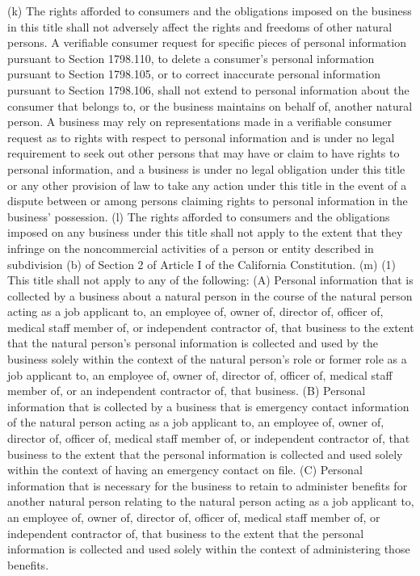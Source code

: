 (k) The rights afforded to consumers and the obligations imposed on the business in this title shall not adversely affect the rights and freedoms of other natural persons. A verifiable consumer request for specific pieces of personal information pursuant to Section 1798.110, to delete a consumer’s personal information pursuant to Section 1798.105, or to correct inaccurate personal information pursuant to Section 1798.106, shall not extend to personal information about the consumer that belongs to, or the business maintains on behalf of, another natural person. A business may rely on representations made in a verifiable consumer request as to rights with respect to personal information and is under no legal requirement to seek out other persons that may have or claim to have rights to personal information, and a business is under no legal obligation under this title or any other provision of law to take any action under this title in the event of a dispute between or among persons claiming rights to personal information in the business’ possession.
(l) The rights afforded to consumers and the obligations imposed on any business under this title shall not apply to the extent that they infringe on the noncommercial activities of a person or entity described in subdivision (b) of Section 2 of Article I of the California Constitution.
(m) (1) This title shall not apply to any of the following:
(A) Personal information that is collected by a business about a natural person in the course of the natural person acting as a job applicant to, an employee of, owner of, director of, officer of, medical staff member of, or independent contractor of, that business to the extent that the natural person’s personal information is collected and used by the business solely within the context of the natural person’s role or former role as a job applicant to, an employee of, owner of, director of, officer of, medical staff member of, or an independent contractor of, that business.
(B) Personal information that is collected by a business that is emergency contact information of the natural person acting as a job applicant to, an employee of, owner of, director of, officer of, medical staff member of, or independent contractor of, that business to the extent that the personal information is collected and used solely within the context of having an emergency contact on file.
(C) Personal information that is necessary for the business to retain to administer benefits for another natural person relating to the natural person acting as a job applicant to, an employee of, owner of, director of, officer of, medical staff member of, or independent contractor of, that business to the extent that the personal information is collected and used solely within the context of administering those benefits.
